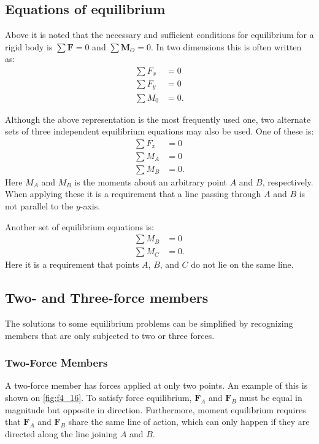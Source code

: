 

\subsection{Equations of equilibrium}
Above it is noted that the necessary and sufficient conditions for equilibrium for a rigid body is $\sum \textbf{F} = 0$ and $\sum \textbf{M}_O = 0$. In two dimensions this is often written as:
\begin{align*}
  \sum F_x &= 0 \\
  \sum F_y &= 0 \\
  \sum M_0 &= 0
.\end{align*}

Although the above representation is the most frequently used one, two alternate sets of three independent equilibrium equations may also be used. One of these is:
\begin{align*}
  \sum F_x &= 0 \\
  \sum M_A &= 0 \\
  \sum M_B &= 0
.\end{align*}
Here $M_A$ and $M_B$ is the moments about an arbitrary point $A$ and $B$, respectively. When applying these it is a requirement that a line passing through $A$ and $B$ is not parallel to the $y$-axis. 

Another set of equilibrium equations is:
\begin{align*}
  \sum M_B &= 0 \\
  \sum M_C &= 0
.\end{align*}
Here it is a requirement that points $A$, $B$, and $C$ do not lie on the same line.


\subsection{Two- and Three-force members}
The solutions to some equilibrium problems can be simplified by recognizing members that are only subjected to two or three forces.

\subsubsection{Two-Force Members}
A two-force member has forces applied at only two points. An example of this is shown on \autoref{fig:f4_16}. To satisfy force equilibrium, $\textbf{F}_A$ and $\textbf{F}_B$ must be equal in magnitude but opposite in direction. Furthermore, moment equilibrium requires that $\textbf{F}_A$ and $\textbf{F}_B$ share the same line of action, which can only happen if they are directed along the line joining $A$ and $B$. 

